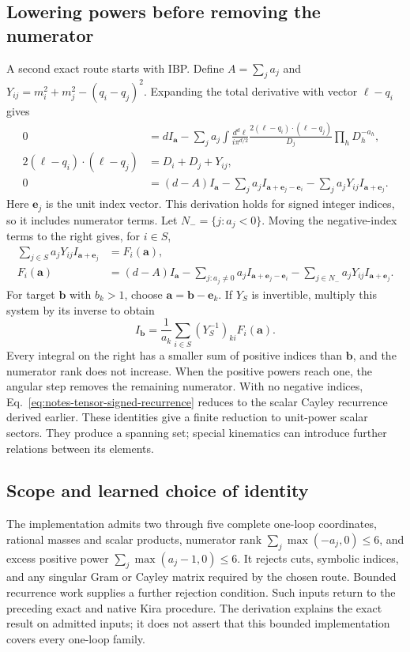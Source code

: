 \subsection{Lowering powers before removing the numerator}
A second exact route starts with IBP. Define $A=\sum_j a_j$ and $Y_{ij}=m_i^2+m_j^2-(q_i-q_j)^2$. Expanding the total derivative with vector $\ell-q_i$ gives
\begin{align}
 0&=d I_{\boldsymbol a}
 -\sum_j a_j\int\frac{d^d\ell}{i\pi^{d/2}}
 \frac{2(\ell-q_i)\cdot(\ell-q_j)}{D_j}\prod_hD_h^{-a_h},\\
 2(\ell-q_i)\cdot(\ell-q_j)&=D_i+D_j+Y_{ij},\\
 0&=(d-A)I_{\boldsymbol a}
 -\sum_j a_j I_{\boldsymbol a+\boldsymbol e_j-\boldsymbol e_i}
 -\sum_j a_jY_{ij}I_{\boldsymbol a+\boldsymbol e_j}.
 \label{eq:notes-tensor-ibp}
\end{align}
Here $\boldsymbol e_j$ is the unit index vector. This derivation holds for signed integer indices, so it includes numerator terms. Let $N_- =\{j:a_j<0\}$. Moving the negative-index terms to the right gives, for $i\in S$,
\begin{align}
 \sum_{j\in S}a_jY_{ij}I_{\boldsymbol a+\boldsymbol e_j}&=F_i(\boldsymbol a),\\
 F_i(\boldsymbol a)&=(d-A)I_{\boldsymbol a}
 -\sum_{j:a_j\ne0}a_j I_{\boldsymbol a+\boldsymbol e_j-\boldsymbol e_i}
 -\sum_{j\in N_-}a_jY_{ij}I_{\boldsymbol a+\boldsymbol e_j}.
 \label{eq:notes-tensor-signed-system}
\end{align}
For target $\boldsymbol b$ with $b_k>1$, choose $\boldsymbol a=\boldsymbol b-\boldsymbol e_k$. If $Y_S$ is invertible, multiply this system by its inverse to obtain
\begin{equation}
 I_{\boldsymbol b}=\frac{1}{a_k}
 \sum_{i\in S}(Y_S^{-1})_{ki}F_i(\boldsymbol a).
 \label{eq:notes-tensor-signed-recurrence}
\end{equation}
Every integral on the right has a smaller sum of positive indices than $\boldsymbol b$, and the numerator rank does not increase. When the positive powers reach one, the angular step removes the remaining numerator. With no negative indices, Eq.~\eqref{eq:notes-tensor-signed-recurrence} reduces to the scalar Cayley recurrence derived earlier. These identities give a finite reduction to unit-power scalar sectors. They produce a spanning set; special kinematics can introduce further relations between its elements.

\subsection{Scope and learned choice of identity}
The implementation admits two through five complete one-loop coordinates, rational masses and scalar products, numerator rank $\sum_j\max(-a_j,0)\leq6$, and excess positive power $\sum_j\max(a_j-1,0)\leq6$. It rejects cuts, symbolic indices, and any singular Gram or Cayley matrix required by the chosen route. Bounded recurrence work supplies a further rejection condition. Such inputs return to the preceding exact and native Kira procedure. The derivation explains the exact result on admitted inputs; it does not assert that this bounded implementation covers every one-loop family.

